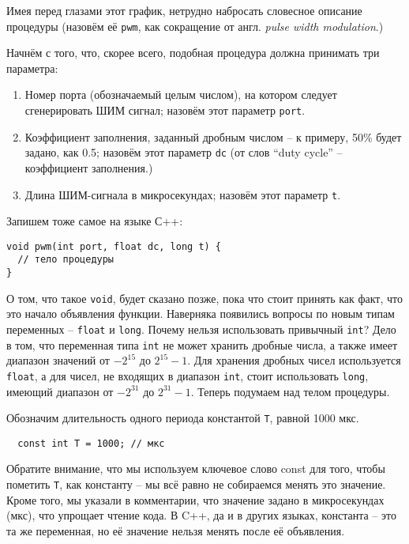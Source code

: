 \documentclass[../sparc.tex]{subfiles}
\begin{document}
Имея перед глазами этот график, нетрудно набросать словесное описание процедуры
(назовём её \texttt{pwm}, как сокращение от англ. \emph{pulse width
modulation}.)

Начнём с того, что, скорее всего, подобная процедура должна принимать три
параметра:
\begin{enumerate}
\item Номер порта (обозначаемый целым числом), на котором следует сгенерировать
  ШИМ сигнал; назовём этот параметр \texttt{port}.
\item Коэффициент заполнения, заданный дробным числом -- к примеру, 50\% будет
  задано, как 0.5; назовём этот параметр \texttt{dc} (от слов ``duty cycle'' --
  коэффициент заполнения.)
\item Длина ШИМ-сигнала в микросекундах; назовём этот параметр
  \texttt{t}.
\end{enumerate}

Запишем тоже самое на языке С++:

\begin{verbatim}
void pwm(int port, float dc, long t) {
  // тело процедуры
}
\end{verbatim}

О том, что такое \texttt{void}, будет сказано позже, пока что стоит принять как
факт, что это начало объявления функции. Наверняка появились вопросы по новым
типам переменных -- \texttt{float} и \texttt{long}. Почему нельзя использовать
привычный \texttt{int}? Дело в том, что переменная типа \texttt{int} не может
хранить дробные числа, а также имеет диапазон значений от $-2^{15}$ до $2^{15} -
1$. Для хранения дробных чисел используется \texttt{float}, а для чисел, не
входящих в диапазон \texttt{int}, стоит использовать \texttt{long}, имеющий
диапазон от $-2^{31}$ до $2^{31} - 1$.  Теперь подумаем над телом процедуры.

Обозначим длительность одного периода константой \texttt{T}, равной 1000 мкс.

\begin{verbatim}
  const int T = 1000; // мкс
\end{verbatim}

Обратите внимание, что мы используем ключевое слово const для того, чтобы
пометить \texttt{T}, как константу -- мы всё равно не собираемся менять это
значение.  Кроме того, мы указали в комментарии, что значение задано в
микросекундах (мкс), что упрощает чтение кода.  В C++, да и в других языках,
константа -- это та же переменная, но её значение нельзя менять после её
объявления.
\end{document}
